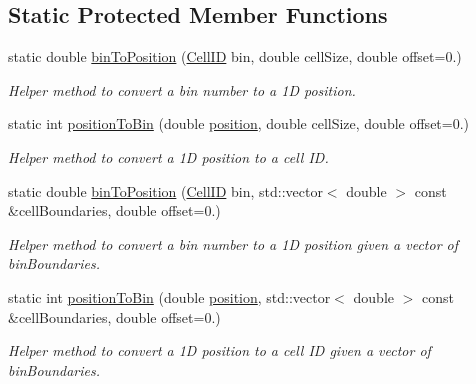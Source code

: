 \subsection*{Static Protected Member Functions}
\begin{DoxyCompactItemize}
\item 
static double \hyperlink{class_d_d4hep_1_1_d_d_segmentation_1_1_segmentation_a550acc9cdf597965091b4d76ce1578cb}{bin\+To\+Position} (\hyperlink{namespace_d_d4hep_1_1_d_d_segmentation_ac7af071d85cb48820914434a07e21ba1}{Cell\+ID} bin, double cell\+Size, double offset=0.)
\begin{DoxyCompactList}\small\item\em Helper method to convert a bin number to a 1D position. \end{DoxyCompactList}\item 
static int \hyperlink{class_d_d4hep_1_1_d_d_segmentation_1_1_segmentation_ac4b0fad36827310fd144843d77e39d71}{position\+To\+Bin} (double \hyperlink{class_d_d4hep_1_1_d_d_segmentation_1_1_segmentation_a594fe6d78667415855858d083b64acad}{position}, double cell\+Size, double offset=0.)
\begin{DoxyCompactList}\small\item\em Helper method to convert a 1D position to a cell ID. \end{DoxyCompactList}\item 
static double \hyperlink{class_d_d4hep_1_1_d_d_segmentation_1_1_segmentation_aeb5bfa97c90cefa129ad0c5d2dcb94fc}{bin\+To\+Position} (\hyperlink{namespace_d_d4hep_1_1_d_d_segmentation_ac7af071d85cb48820914434a07e21ba1}{Cell\+ID} bin, std\+::vector$<$ double $>$ const \&cell\+Boundaries, double offset=0.)
\begin{DoxyCompactList}\small\item\em Helper method to convert a bin number to a 1D position given a vector of bin\+Boundaries. \end{DoxyCompactList}\item 
static int \hyperlink{class_d_d4hep_1_1_d_d_segmentation_1_1_segmentation_a9357e76769306a1bf6f92c8a5d8eb6b4}{position\+To\+Bin} (double \hyperlink{class_d_d4hep_1_1_d_d_segmentation_1_1_segmentation_a594fe6d78667415855858d083b64acad}{position}, std\+::vector$<$ double $>$ const \&cell\+Boundaries, double offset=0.)
\begin{DoxyCompactList}\small\item\em Helper method to convert a 1D position to a cell ID given a vector of bin\+Boundaries. \end{DoxyCompactList}\end{DoxyCompactItemize}
